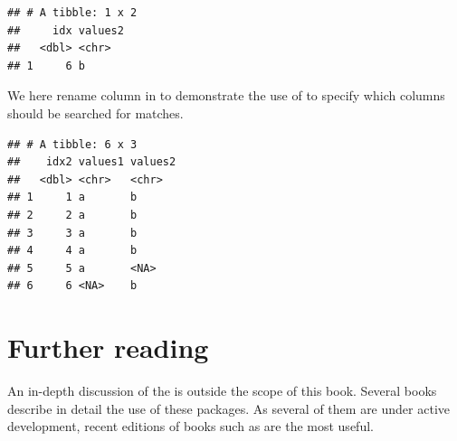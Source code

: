 \documentclass[krantz2]{krantz}\usepackage{knitr}
\begin{document}
\begin{knitrout}\footnotesize
{}\color{fgcolor}\begin{kframe}
\begin{alltt}
\hlstd{(}   
\end{alltt}


{\ttfamily\noindent\itshape{}}\begin{verbatim}
## # A tibble: 1 x 2
##     idx values2
##   <dbl> <chr>  
## 1     6 b
\end{verbatim}
\end{kframe}
\end{knitrout}

We here rename column  in  to demonstrate the use of  to specify which columns should be searched for matches.

\begin{knitrout}\footnotesize
{}\color{fgcolor}\begin{kframe}
\begin{alltt}
 \hlkwb{<-}   
\hlstd{(}     \hlstd{=} \hlstd{(} \hlstd{=} \hlstd{))}
\end{alltt}
\begin{verbatim}
## # A tibble: 6 x 3
##    idx2 values1 values2
##   <dbl> <chr>   <chr>  
## 1     1 a       b      
## 2     2 a       b      
## 3     3 a       b      
## 4     4 a       b      
## 5     5 a       <NA>   
## 6     6 <NA>    b
\end{verbatim}
\end{kframe}
\end{knitrout}



\section{Further reading}
An in-depth discussion of the  is outside the scope of this book. Several books describe in detail the use of these packages. As several of them are under active development, recent editions of books such as  \autocite{Wickham2017} are the most useful.
\end{document}
